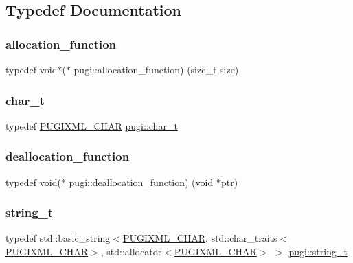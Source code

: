 \subsection{Typedef Documentation}
\mbox{\label{namespacepugi_a7b2d97e5b6040fe323d342268b6ffd4b}} 
\subsubsection{\texorpdfstring{allocation\+\_\+function}{allocation\_function}}
{\footnotesize\ttfamily typedef void$\ast$($\ast$ pugi\+::allocation\+\_\+function) (size\+\_\+t size)}

\mbox{\label{namespacepugi_aef5a7a62cba0507542220ea15afe39df}} 
\subsubsection{\texorpdfstring{char\+\_\+t}{char\_t}}
{\footnotesize\ttfamily typedef \hyperlink{pugixml_8hpp_af467437c41f223eaed56106370aa82ff}{P\+U\+G\+I\+X\+M\+L\+\_\+\+C\+H\+AR} \hyperlink{namespacepugi_aef5a7a62cba0507542220ea15afe39df}{pugi\+::char\+\_\+t}}

\mbox{\label{namespacepugi_a3587161b9f8d7ac4ac2d6a45b82462be}} 
\subsubsection{\texorpdfstring{deallocation\+\_\+function}{deallocation\_function}}
{\footnotesize\ttfamily typedef void($\ast$ pugi\+::deallocation\+\_\+function) (void $\ast$ptr)}

\mbox{\label{namespacepugi_a053b39a84c8bb031ff3973d1954a876c}} 
\subsubsection{\texorpdfstring{string\+\_\+t}{string\_t}}
{\footnotesize\ttfamily typedef std\+::basic\+\_\+string$<$\hyperlink{pugixml_8hpp_af467437c41f223eaed56106370aa82ff}{P\+U\+G\+I\+X\+M\+L\+\_\+\+C\+H\+AR}, std\+::char\+\_\+traits$<$\hyperlink{pugixml_8hpp_af467437c41f223eaed56106370aa82ff}{P\+U\+G\+I\+X\+M\+L\+\_\+\+C\+H\+AR}$>$, std\+::allocator$<$\hyperlink{pugixml_8hpp_af467437c41f223eaed56106370aa82ff}{P\+U\+G\+I\+X\+M\+L\+\_\+\+C\+H\+AR}$>$ $>$ \hyperlink{namespacepugi_a053b39a84c8bb031ff3973d1954a876c}{pugi\+::string\+\_\+t}}



